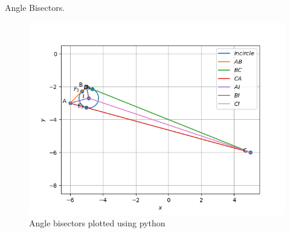 \begin{table}[H]
        \centering
        
        \caption{Angle Bisectors.}
        \label{tab:Angle_bisector}
    \end{table}
\begin{figure}[H]
\includegraphics[width=\columnwidth]{1.5/figs/15.png}
\caption{Angle bisectors plotted using python}
\label{fig:i_angle_bisector_py}
\end{figure}
